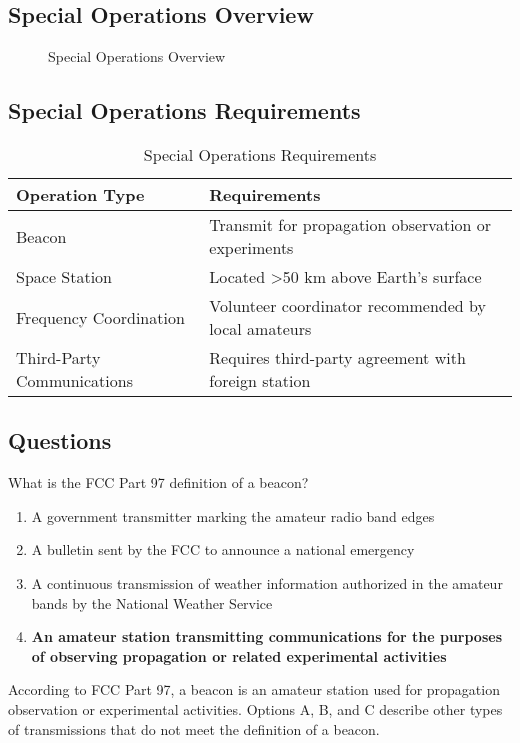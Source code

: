 \subsection*{Special Operations Overview}
\begin{figure}[h]
    \centering
    \caption{Special Operations Overview}
    \label{fig:special_ops}
\end{figure}

\subsection*{Special Operations Requirements}
\begin{table}[h]
    \centering
    \begin{tabular}{|l|l|}
        \hline
        \textbf{Operation Type} & \textbf{Requirements} \\ \hline
        Beacon & Transmit for propagation observation or experiments \\ \hline
        Space Station & Located >50 km above Earth's surface \\ \hline
        Frequency Coordination & Volunteer coordinator recommended by local amateurs \\ \hline
        Third-Party Communications & Requires third-party agreement with foreign station \\ \hline
    \end{tabular}
    \caption{Special Operations Requirements}
    \label{tab:special_ops}
\end{table}

\subsection*{Questions}
\begin{tcolorbox}[colback=gray!10!white,colframe=black!75!black,title={T1A06}]
    What is the FCC Part 97 definition of a beacon?
    \begin{enumerate}[label=\Alph*),noitemsep]
        \item A government transmitter marking the amateur radio band edges
        \item A bulletin sent by the FCC to announce a national emergency
        \item A continuous transmission of weather information authorized in the amateur bands by the National Weather Service
        \item \textbf{An amateur station transmitting communications for the purposes of observing propagation or related experimental activities}
    \end{enumerate}
\end{tcolorbox}
According to FCC Part 97, a beacon is an amateur station used for propagation observation or experimental activities. Options A, B, and C describe other types of transmissions that do not meet the definition of a beacon.

